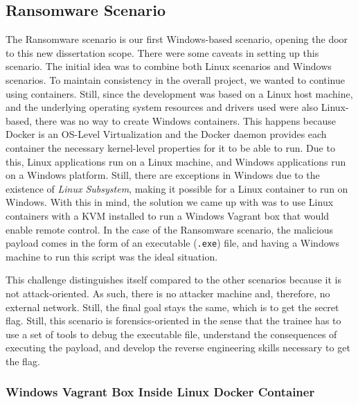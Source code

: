 \subsection{Ransomware Scenario} \label{sec:validation_ransomware_scenario}

The Ransomware scenario is our first Windows-based scenario, opening the door to this new dissertation scope. There were some caveats in setting up this scenario. The initial idea was to combine both Linux scenarios and Windows scenarios. To maintain consistency in the overall project, we wanted to continue using containers. Still, since the development was based on a Linux host machine, and the underlying operating system resources and drivers used were also Linux-based, there was no way to create Windows containers. This happens because Docker is an OS-Level Virtualization and the Docker daemon provides each container the necessary kernel-level properties for it to be able to run. Due to this, Linux applications run on a Linux machine, and Windows applications run on a Windows platform. Still, there are exceptions in Windows due to the existence of \textit{Linux Subsystem}, making it possible for a Linux container to run on Windows. With this in mind, the solution we came up with was to use Linux containers with a KVM installed to run a Windows Vagrant box that would enable remote control. In the case of the Ransomware scenario, the malicious payload comes in the form of an executable (\texttt{.exe}) file, and having a Windows machine to run this script was the ideal situation. 

This challenge distinguishes itself compared to the other scenarios because it is not attack-oriented. As such, there is no attacker machine and, therefore, no external network. Still, the final goal stays the same, which is to get the secret flag. Still, this scenario is forensics-oriented in the sense that the trainee has to use a set of tools to debug the executable file, understand the consequences of executing the payload, and develop the reverse engineering skills necessary to get the flag.

\subsubsection{Windows Vagrant Box Inside Linux Docker Container} \label{sec:validation_windows_vagrant_inside_linux_docker}


